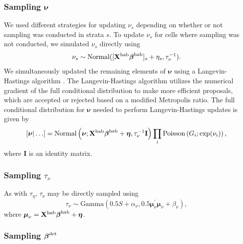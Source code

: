 \documentclass[10pt]{article}
\begin{document}
\subsubsection*{Sampling $\boldsymbol{\nu}$}
We used different strategies for updating $\nu_s$ depending on whether or not sampling was conducted in strata $s$. To update $\nu_s$ for cells where sampling was not conducted, we simulated $\nu_s$ directly using
$$
\nu_s \sim {\rm Normal}([{\bf X}^{\rm hab} \boldsymbol{\beta}^{\rm hab}]_s+\eta_s,\tau_\nu^{-1}).
$$
We simultaneously updated the remaining elements of $\boldsymbol{\nu}$ using
a Langevin-Hastings algorithm \cite{RobertCasella2004}.  The Langevin-Hastings algorithm utilizes the numerical gradient of the full conditional distribution to make more efficient proposals, which are accepted or rejected based on a modified Metropolis ratio.  The full conditional distribution for $\boldsymbol{\nu}$ needed to perform Langevin-Hastings updates is given by
$$
\left[ \boldsymbol{\nu} | \hdots \right] = \textrm{Normal}\left(\boldsymbol{\nu};{\bf X}^{\rm hab}\boldsymbol{\beta}^{\rm hab}+\boldsymbol{\eta},\tau_\nu^{-1} {\bf I} \right) \prod_i \textrm{Poisson} \left( G_i; \exp(\nu_i) \right),
$$
where {\bf I} is an identity matrix.

\subsubsection*{Sampling $\tau_\nu$}
As with $\tau_\eta$, $\tau_\nu$ may be directly sampled using
$$
\tau_\nu \sim \textrm{Gamma}\left( 0.5S+\alpha_\nu,0.5\boldsymbol{\mu}_\nu^\prime \boldsymbol{\mu}_\nu+\beta_\nu \right),
$$
where $\boldsymbol{\mu}_\nu={\bf X}^{\rm hab}\boldsymbol{\beta}^{\rm hab}+\boldsymbol{\eta}$.

\subsubsection*{Sampling $\boldsymbol{\beta}^{\rm det}$}
\end{document}
